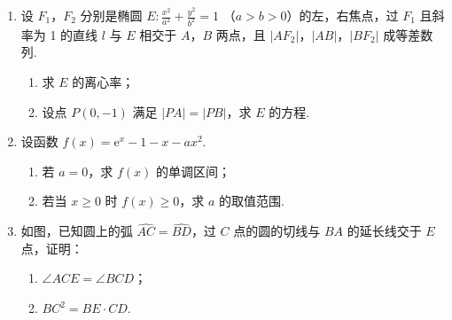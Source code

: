 \begin{description}
\begin{enumerate}[leftmargin=5pt]
\begin{enumerate}
\item 估计该地区老年人中，需要志愿者提供帮助的老年人的比例；
\item 能否有 \(99\%\) 的把握认为该地区的老年人是否需要志愿者提供帮助与性别有关？
\item 根据（2）的结论，能否提出更好的调查方法来估计该地区老年人中，需要志愿者帮助的老年人的比例？说明理由.
\end{enumerate}

附：
\begin{center}
\begin{tabular}{c|c c c}
\(P(K^2\geqslant k)\) & \(0.050\) & \(0.010\) & \(0.001\) \\
\hline
\(k\) & \(3.841\) & \(6.635\) & \(10.828\)
\end{tabular}
\end{center}

\begin{center}
\(\displaystyle K ^{2} = \frac {n (a d - b c) ^{2}}{(a + b) (c + d) (a + c) (b + d)}\)
\end{center}

        \item 设 \(F_{1}\)，\(F_{2}\) 分别是椭圆 \(E: \frac{x^{2}}{a^{2}} + \frac{y^{2}}{b^{2}} = 1 \) （\(a > b > 0\)）的左，右焦点，过 \(F_{1}\) 且斜率为 1 的直线 \(l\) 与 \(E\) 相交于 \(A\)，\(B\) 两点，且 \(|AF_{2}|\)，\(|AB|\)，\(|BF_{2}|\) 成等差数列.

\begin{enumerate}
\item 求 \(E\) 的离心率；
\item 设点 \(P(0, -1)\) 满足 \(|PA| = |PB|\)，求 \(E\) 的方程.
\end{enumerate}

        \item 设函数 \( f(x) = {\mathrm{e}}^{x} - 1 - x - ax^2 \).

\begin{enumerate}
\item 若 \(a = 0\)，求 \(f(x)\) 的单调区间；
\item 若当 \(x \geqslant 0\) 时 \(f(x) \geqslant 0\)，求 \(a\) 的取值范围.
\end{enumerate}

        \item 如图，已知圆上的弧 \(\widehat{AC} = \widehat{BD}\)，过 \(C\) 点的圆的切线与 \(BA\) 的延长线交于 \(E\) 点，证明：

\begin{enumerate}
\item \(\angle ACE = \angle BCD\)；
\item \(BC^{2} = BE\cdot CD\).
\end{enumerate}


\end{enumerate}
\end{description}
